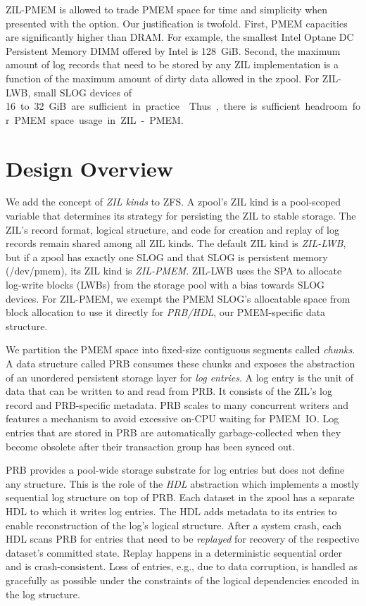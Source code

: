 \documentclass[12pt,a4paper,twoside]{book}
\begin{document}
{
ZIL-PMEM is allowed to trade PMEM space for time and simplicity when presented with the option.
Our justification is twofold.
First, PMEM capacities are significantly higher than DRAM.
For example, the smallest Intel Optane DC Persistent Memory DIMM offered by Intel is 128~GiB.
Second, the maximum amount of log records that need to be stored by any ZIL implementation is a function of the maximum amount of dirty data allowed in the zpool.
For ZIL-LWB, small SLOG devices of \SI{16} to 32~GiB are sufficient in practice \cite{OpenZFSDocsWorkloadTuningSynchronousIO}.
Thus, there is sufficient headroom for PMEM space usage in ZIL-PMEM.

\section{Design Overview}\label{sec:designoverview}
We add the concept of \textit{ZIL kinds} to ZFS.
A zpool's ZIL kind is a pool-scoped variable that determines its strategy for persisting the ZIL to stable storage.
The ZIL's record format, logical structure, and code for creation and replay of log records remain shared among all ZIL kinds.
The default ZIL kind is \textit{ZIL-LWB}, but if a zpool has exactly one SLOG and that SLOG is persistent memory (/dev/pmem), its ZIL kind is \textit{ZIL-PMEM}.
ZIL-LWB uses the SPA to allocate log-write blocks (LWBs) from the storage pool with a bias towards SLOG devices.
For ZIL-PMEM, we exempt the PMEM SLOG's allocatable space from block allocation to use it directly for \textit{PRB/HDL}, our PMEM-specific data structure.

We partition the PMEM space into fixed-size contiguous segments called \textit{chunks}.
A data structure called PRB consumes these chunks and exposes the abstraction of an unordered persistent storage layer for \textit{log entries}.
A log entry is the unit of data that can be written to and read from PRB.
It consists of the ZIL's log record and PRB-specific metadata.
PRB scales to many concurrent writers and features a mechanism to avoid excessive on-CPU waiting for PMEM~IO.
Log entries that are stored in PRB are automatically garbage-collected when they become obsolete after their transaction group has been synced out.

PRB provides a pool-wide storage substrate for log entries but does not define any structure.
This is the role of the \textit{HDL} abstraction which implements a mostly sequential log structure on top of PRB.
Each dataset in the zpool has a separate HDL to which it writes log entries.
The HDL adds metadata to its entries to enable reconstruction of the log's logical structure.
After a system crash, each HDL scans PRB for entries that need to be \textit{replayed} for recovery of the respective dataset's committed state.
Replay happens in a deterministic sequential order and is crash-consistent.
Loss of entries, e.g., due to data corruption, is handled as gracefully as possible under the constraints of the logical dependencies encoded in the log structure.

}
\end{document}
